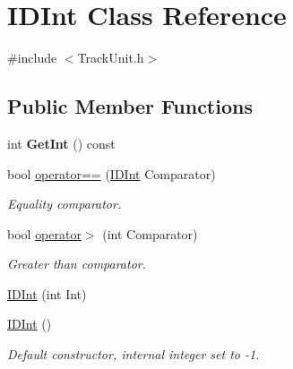 \hypertarget{class_i_d_int}{}\section{I\+D\+Int Class Reference}
\label{class_i_d_int}


{\ttfamily \#include $<$Track\+Unit.\+h$>$}

\subsection*{Public Member Functions}
\begin{DoxyCompactItemize}
\item 
\mbox{\label{class_i_d_int_a3c40e609e12caab2063aa7f3ff8b8ea7}} 
int {\bfseries Get\+Int} () const
\item 
\mbox{\label{class_i_d_int_ae083414184db298f8abbfbe791db82de}} 
bool \mbox{\hyperlink{class_i_d_int_ae083414184db298f8abbfbe791db82de}{operator==}} (\mbox{\hyperlink{class_i_d_int}{I\+D\+Int}} Comparator)
\begin{DoxyCompactList}\small\item\em Equality comparator. \end{DoxyCompactList}\item 
\mbox{\label{class_i_d_int_ae309faa19a8c2f2a6f5e16c7cd64f184}} 
bool \mbox{\hyperlink{class_i_d_int_ae309faa19a8c2f2a6f5e16c7cd64f184}{operator$>$}} (int Comparator)
\begin{DoxyCompactList}\small\item\em Greater than comparator. \end{DoxyCompactList}\item 
\mbox{\hyperlink{class_i_d_int_ae51fdc864457738e484bb91c829b082c}{I\+D\+Int}} (int Int)
\item 
\mbox{\label{class_i_d_int_ae0583f8509efd2cff2fa60b52e7b5cea}} 
\mbox{\hyperlink{class_i_d_int_ae0583f8509efd2cff2fa60b52e7b5cea}{I\+D\+Int}} ()
\begin{DoxyCompactList}\small\item\em Default constructor, internal integer set to -\/1. \end{DoxyCompactList}\end{DoxyCompactItemize}
